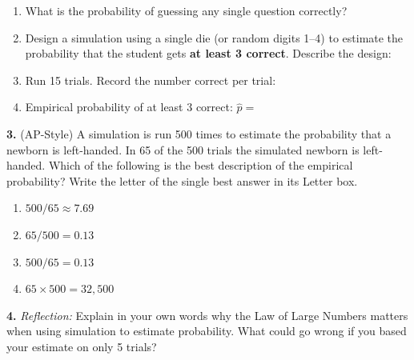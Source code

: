 \documentclass[10pt]{article}
\begin{document}
\begin{practicebox}
\begin{enumerate}[label=(\alph*), leftmargin=2em, itemsep=8pt]
  \item What is the probability of guessing any single question correctly? \makebox[2cm][l]{\hspace{1.6cm}\smash{\raisebox{-4pt}{\gradedblank[id=hw2a, type=short, points=1, answer=0.25, check=numeric, tolerance=0]{1.8cm}{0.2in}}}}
  \item Design a simulation using a single die (or random digits 1--4) to estimate the
        probability that the student gets \textbf{at least 3 correct}.
        Describe the design:\\
\tcbbreak
  \item Run 15 trials. Record the number correct per trial:
        \vspace{20pt}
  \item Empirical probability of at least 3 correct: $\hat{p} = {}$\\
\end{enumerate}

\vspace{8pt}
\textbf{3.} (AP-Style) A simulation is run 500 times to estimate the probability
that a newborn is left-handed. In 65 of the 500 trials the simulated newborn is
left-handed. Which of the following is the best description of the empirical
probability? Write the letter of the single best answer in its Letter box.

\begin{enumerate}[label=(\Alph*), leftmargin=2em, itemsep=4pt]
  \item $500/65 \approx 7.69$
  \item $65/500 = 0.13$
  \item $500/65 = 0.13$
  \item $65 \times 500 = 32{,}500$
        \hfill{}\rule[-14pt]{0pt}{32pt}
\end{enumerate}

\vspace{8pt}
\textbf{4.} \textit{Reflection:} Explain in your own words why the Law of Large Numbers
matters when using simulation to estimate probability. What could go wrong if you based
your estimate on only 5 trials?\\[6pt]


\end{practicebox}
\end{document}
